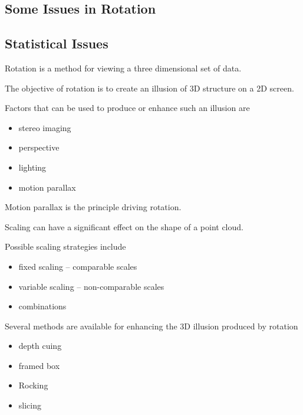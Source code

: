 \begin{slide}{}
\section{Some Issues in Rotation}
\subsection{Statistical Issues}
Rotation is a method for viewing a three dimensional set of data.

The objective of rotation is to create an illusion of 3D structure on
a 2D screen.

Factors that can be used to produce or enhance such an illusion are
\begin{itemize}
\item stereo imaging
\item perspective
\item lighting
\item motion parallax
\end{itemize}
Motion parallax is the principle driving rotation.
\end{slide}

\begin{slide}{}
Scaling can have a significant effect on the shape of a point cloud.

Possible scaling strategies include
\begin{itemize}
\item fixed scaling --  comparable scales
\item variable scaling -- non-comparable scales
\item combinations
\end{itemize}

Several methods are available for enhancing the 3D illusion
produced by rotation
\begin{itemize}
\item depth cuing
\item framed box
\item Rocking
\item slicing
\end{itemize}
\end{slide}


